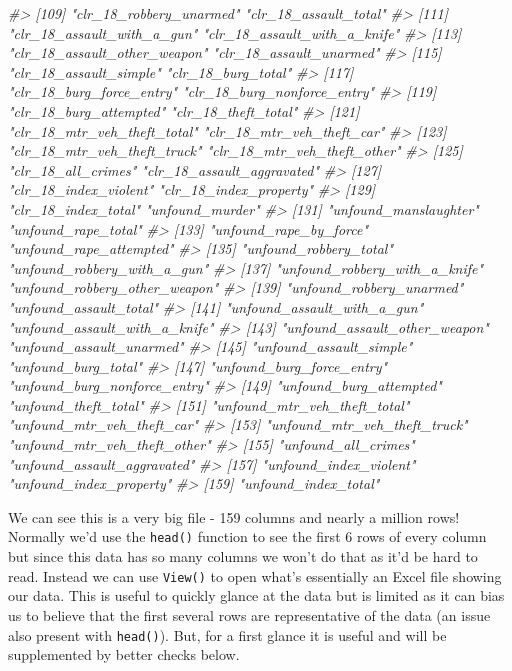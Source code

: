 \documentclass[
  12pt,
]{book}
\newenvironment{Shaded}{\begin{snugshade}}{\end{snugshade}}
\newcommand{\CommentTok}[1]{\textcolor[rgb]{0.56,0.35,0.01}{\textit{#1}}}
\begin{document}
\begin{Shaded}
\begin{Highlighting}[]
\CommentTok{\#> [109] "clr\_18\_robbery\_unarmed"         "clr\_18\_assault\_total"          }
\CommentTok{\#> [111] "clr\_18\_assault\_with\_a\_gun"      "clr\_18\_assault\_with\_a\_knife"   }
\CommentTok{\#> [113] "clr\_18\_assault\_other\_weapon"    "clr\_18\_assault\_unarmed"        }
\CommentTok{\#> [115] "clr\_18\_assault\_simple"          "clr\_18\_burg\_total"             }
\CommentTok{\#> [117] "clr\_18\_burg\_force\_entry"        "clr\_18\_burg\_nonforce\_entry"    }
\CommentTok{\#> [119] "clr\_18\_burg\_attempted"          "clr\_18\_theft\_total"            }
\CommentTok{\#> [121] "clr\_18\_mtr\_veh\_theft\_total"     "clr\_18\_mtr\_veh\_theft\_car"      }
\CommentTok{\#> [123] "clr\_18\_mtr\_veh\_theft\_truck"     "clr\_18\_mtr\_veh\_theft\_other"    }
\CommentTok{\#> [125] "clr\_18\_all\_crimes"              "clr\_18\_assault\_aggravated"     }
\CommentTok{\#> [127] "clr\_18\_index\_violent"           "clr\_18\_index\_property"         }
\CommentTok{\#> [129] "clr\_18\_index\_total"             "unfound\_murder"                }
\CommentTok{\#> [131] "unfound\_manslaughter"           "unfound\_rape\_total"            }
\CommentTok{\#> [133] "unfound\_rape\_by\_force"          "unfound\_rape\_attempted"        }
\CommentTok{\#> [135] "unfound\_robbery\_total"          "unfound\_robbery\_with\_a\_gun"    }
\CommentTok{\#> [137] "unfound\_robbery\_with\_a\_knife"   "unfound\_robbery\_other\_weapon"  }
\CommentTok{\#> [139] "unfound\_robbery\_unarmed"        "unfound\_assault\_total"         }
\CommentTok{\#> [141] "unfound\_assault\_with\_a\_gun"     "unfound\_assault\_with\_a\_knife"  }
\CommentTok{\#> [143] "unfound\_assault\_other\_weapon"   "unfound\_assault\_unarmed"       }
\CommentTok{\#> [145] "unfound\_assault\_simple"         "unfound\_burg\_total"            }
\CommentTok{\#> [147] "unfound\_burg\_force\_entry"       "unfound\_burg\_nonforce\_entry"   }
\CommentTok{\#> [149] "unfound\_burg\_attempted"         "unfound\_theft\_total"           }
\CommentTok{\#> [151] "unfound\_mtr\_veh\_theft\_total"    "unfound\_mtr\_veh\_theft\_car"     }
\CommentTok{\#> [153] "unfound\_mtr\_veh\_theft\_truck"    "unfound\_mtr\_veh\_theft\_other"   }
\CommentTok{\#> [155] "unfound\_all\_crimes"             "unfound\_assault\_aggravated"    }
\CommentTok{\#> [157] "unfound\_index\_violent"          "unfound\_index\_property"        }
\CommentTok{\#> [159] "unfound\_index\_total"}
\end{Highlighting}
\end{Shaded}

We can see this is a very big file - 159 columns and nearly a million rows! Normally we'd use the \texttt{head()} function to see the first 6 rows of every column but since this data has so many columns we won't do that as it'd be hard to read. Instead we can use \texttt{View()} to open what's essentially an Excel file showing our data. This is useful to quickly glance at the data but is limited as it can bias us to believe that the first several rows are representative of the data (an issue also present with \texttt{head()}). But, for a first glance it is useful and will be supplemented by better checks below.
\end{document}
